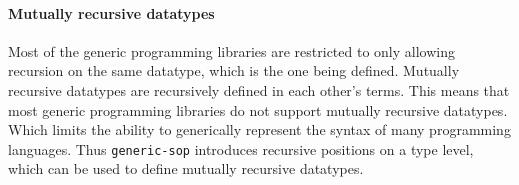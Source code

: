 \paragraph{Mutually recursive datatypes} Most of the generic programming libraries are restricted to only allowing recursion on the same datatype, which is the one being defined. Mutually recursive datatypes are recursively defined in each other's terms. This means that most generic programming libraries do not support mutually recursive datatypes. Which limits the ability to generically represent the syntax of many programming languages. Thus \texttt{generic-sop} introduces recursive positions on a type level, which can be used to define mutually recursive datatypes.